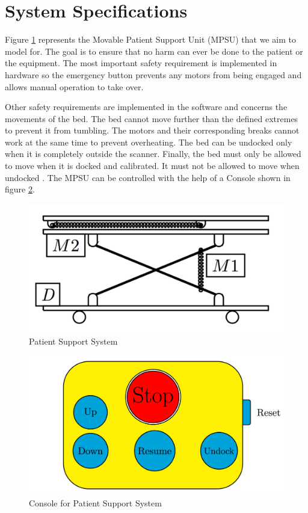 \documentclass{article}
\begin{document}
\section{System Specifications}
Figure \ref{fig:pss} represents the Movable Patient Support Unit (MPSU) that we aim to model for. The goal is to ensure that no harm can ever be done to the patient or the equipment. The most important safety requirement is implemented in hardware so the emergency button prevents any motors from being engaged and allows manual operation to take over.

Other safety requirements are implemented in the software and concerns the movements of the bed. The bed cannot move further than the defined extremes to prevent it from tumbling. The motors and their corresponding breaks cannot work at the same time to prevent overheating. The bed can be undocked only when it is completely outside the scanner. Finally, the bed must only be allowed to move when it is docked and calibrated. It must not be allowed to move when undocked \cite{ponse}. The MPSU can be controlled with the help of a Console shown in figure \ref{fig:console}.

\begin{figure}[!h]
    \centering
    \includegraphics[width=\textwidth]{images/pss.png}
    \caption{Patient Support System}
    \label{fig:pss}
\end{figure}

\begin{figure}[!h]
    \centering
    \includegraphics[width=14.7cm]{images/console.png}
    \caption{Console for Patient Support System}
    \label{fig:console}
\end{figure}
\end{document}
